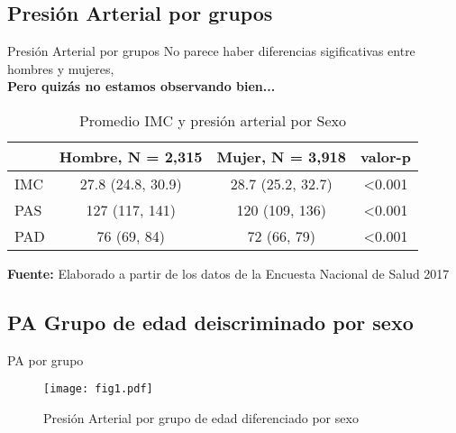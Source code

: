 \documentclass[aspectratio=169]{beamer}
\begin{document}
\subsection*{Presión Arterial por grupos}
\begin{frame}{Presión Arterial por grupos}
    No parece haber diferencias sigificativas entre hombres y mujeres,\\
    \vspace{1mm}
    \textcolor{preambulo}{\textbf{\large Pero quizás no estamos observando bien...}}
    
    \begin{table}
\caption{\small Promedio IMC y presión arterial por Sexo}
    \hspace{-4mm}
    \centering
\begin{tabular}{lccc}
\toprule
\textbf{ } & \textbf{Hombre}, N = 2,315 & \textbf{Mujer}, N = 3,918 & valor-p \\ 
\midrule
IMC & 27.8 (24.8, 30.9) & 28.7 (25.2, 32.7) & <0.001 \\ 
PAS & 127 (117, 141) & 120 (109, 136) & <0.001 \\ 
PAD & 76 (69, 84) & 72 (66, 79) & <0.001 \\ 
 \bottomrule
\end{tabular}
    \vspace{1ex}
    
    {\raggedright \small \textbf{Fuente:} Elaborado a partir de los datos de la Encuesta Nacional de Salud 2017 \par}
\end{table}
\end{frame}

\subsection*{PA Grupo de edad deiscriminado por sexo}
\begin{frame}{PA por grupo}
    \begin{figure}
        \centering
        \texttt{[image: fig1.pdf]}
        \caption{Presión Arterial por grupo de edad diferenciado por sexo}
        \label{fig:my_label}
    \end{figure}
\end{frame}
\end{document}
